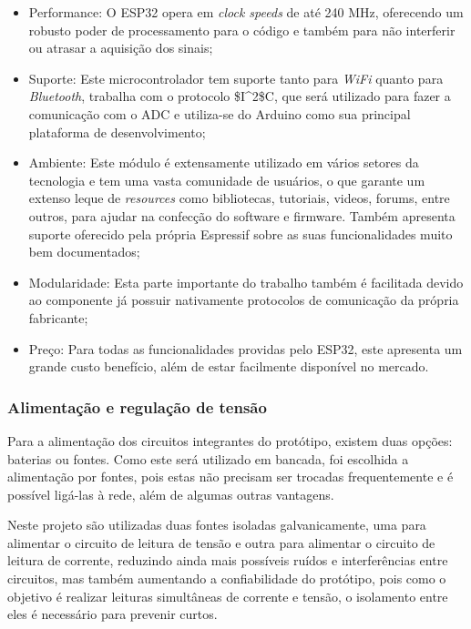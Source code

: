 \begin{itemize}
    \item Performance: O ESP32 opera em \textit{clock speeds} de até 240 MHz, oferecendo um robusto poder de processamento para o código e também para não interferir ou atrasar a aquisição dos sinais;
    \item Suporte: Este microcontrolador tem suporte tanto para \textit{WiFi} quanto para \textit{Bluetooth}, trabalha com o protocolo \gls{$I^2$C}, que será utilizado para fazer a comunicação com o \gls{ADC} e utiliza-se do Arduino como sua principal plataforma de desenvolvimento;
    \item Ambiente: Este módulo é extensamente utilizado em vários setores da tecnologia e tem uma vasta comunidade de usuários, o que garante um extenso leque de \textit{resources} como bibliotecas, tutoriais, videos, forums, entre outros, para ajudar na confecção do software e firmware. Também apresenta suporte oferecido pela própria Espressif sobre as suas funcionalidades muito bem documentados;
    \item Modularidade: Esta parte importante do trabalho também é facilitada devido ao componente já possuir nativamente protocolos de comunicação da própria fabricante;
    \item Preço: Para todas as funcionalidades providas pelo ESP32, este apresenta um grande custo benefício, além de estar facilmente disponível no mercado.
\end{itemize}

\subsubsection{Alimentação e regulação de tensão}

Para a alimentação dos circuitos integrantes do protótipo, existem duas opções: baterias ou fontes. Como este será utilizado em bancada, foi escolhida a alimentação por fontes, pois estas não precisam ser trocadas frequentemente e é possível ligá-las à rede, além de algumas outras vantagens.

Neste projeto são utilizadas duas fontes isoladas galvanicamente, uma para alimentar o circuito de leitura de tensão e outra para alimentar o circuito de leitura de corrente, reduzindo ainda mais possíveis ruídos e interferências entre circuitos, mas também aumentando a confiabilidade do protótipo, pois como o objetivo é realizar leituras simultâneas de corrente e tensão, o isolamento entre eles é necessário para prevenir curtos.

